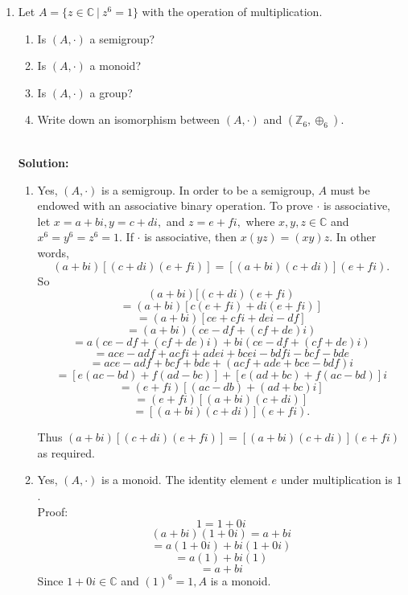 \begin{enumerate}
    \item Let \(A =\{z \in \mathbb{C} \ | \ z^6 = 1\}\) with the operation of multiplication. 
    \begin{enumerate}
        \item Is \((A, \cdot)\) a semigroup?
        \item Is \((A, \cdot)\) a monoid?
        \item Is \((A, \cdot)\) a group?
        \item Write down an isomorphism between \((A, \cdot)\) and \((\mathbb{Z}_{6}, \oplus_6)\).
        \\\\
    \end{enumerate}
    
    \textbf{Solution:}
    \begin{enumerate}
        \item Yes, \((A, \cdot)\) is a semigroup. In order to be a semigroup, \(A\) must be endowed with an associative binary operation. To prove \(\cdot\) is associative, let \(x=a+bi, y=c+di,\) and \(z=e+fi,\) where \(x,y,z \in \mathbb{C}\) and \(x^6 = y^6 = z^6 = 1.\) If \(\cdot\) is associative, then \(x(yz) = (xy)z.\) In other words, 
        \[(a+bi)[(c+di)(e+fi)] = [(a+bi)(c+di)](e+fi).\]
        So
        \[(a+bi)[(c+di)(e+fi)\]
        \[=(a+bi)[c(e+fi) + di(e+fi)]\]
        \[=(a+bi)[ce + cfi + dei - df]\]
        \[=(a+bi)(ce - df + (cf + de)i)\]
        \[=a(ce-df+(cf+de)i) + bi(ce-df+(cf+de)i)\]
        \[=ace-adf+acfi+adei+bcei-bdfi-bcf-bde\]
        \[=ace-adf+bcf+bde+(acf+ade+bce-bdf)i\]
        \[=[e(ac-bd) + f(ad-bc)] + [e(ad+bc) + f(ac-bd)]i\]
        \[=(e+fi)[(ac-db)+(ad+bc)i]\]
        \[=(e+fi)[(a+bi)(c+di)]\]
        \[=[(a+bi)(c+di)](e+fi).\]
        
        Thus \((a+bi)[(c+di)(e+fi)] = [(a+bi)(c+di)](e+fi)\) as required.
        
        \item Yes, \((A, \cdot)\) is a monoid. The identity element \(e\) under multiplication is \(1\). \\
        Proof: 
        \[1 = 1 + 0i\]
        \[(a+bi)(1+0i) = a+bi\]
        \[=a(1+0i) + bi(1+0i)\]
        \[=a(1) + bi(1)\]
        \[=a + bi\]
        Since \(1+0i \in \mathbb{C}\) and \((1)^6 = 1, A\) is a monoid.
        

\end{enumerate}
\end{enumerate}
